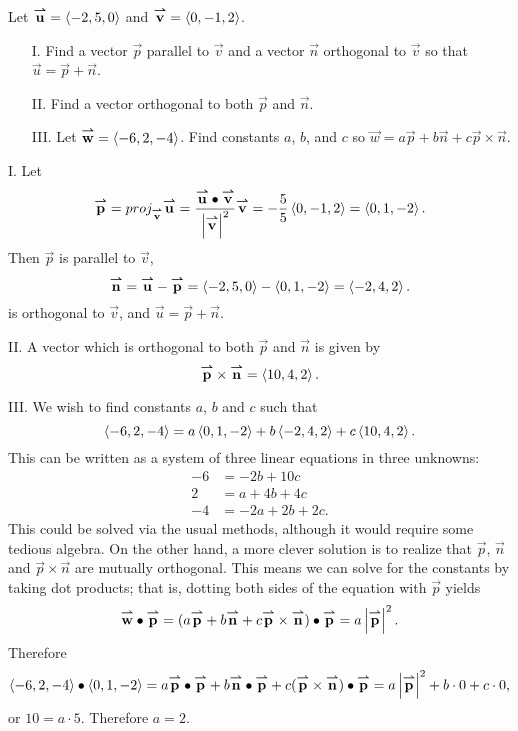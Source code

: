 \documentclass[noauthor, handout]{ximera}
\begin{document}
\begin{problem}
Let $\vec{u} = \vector{-2,5,0}$ and $\vec{v} = \vector{0,-1,2}$. 
\begin{itemize}
\item[I.] Find a vector $\vec{p}$ parallel to $\vec{v}$ and a vector $\vec{n}$ orthogonal to $\vec{v}$ so that $\vec{u} = \vec{p} + \vec{n}$.

\item[II.]  Find a vector orthogonal to both $\vec{p}$ and $\vec{n}$.

\item[III.] Let $\vec{w} = \vector{-6,2,-4}$. Find constants $a$, $b$, and $c$ so $\vec{w} = a\vec{p}+b\vec{n}+c\vec{p} \times \vec{n}$.

\end{itemize}

\begin{freeResponse}
I. Let 
$$
\vec{p} = proj_\vec{v} \vec{u} = \frac{\vec{u}\dotp \vec{v}}{\left|\vec{v}\right|^2} \vec{v} = -\frac{5}{5} \vector{0,-1,2} = \vector{0,1,-2}.
$$
Then $\vec{p}$ is parallel to $\vec{v}$, 
$$
\vec{n} = \vec{u} - \vec{p} = \vector{-2,5,0} - \vector{0,1,-2} = \vector{-2,4,2}.
$$
is orthogonal to $\vec{v}$, and $\vec{u} = \vec{p} + \vec{n}$.

II. A vector which is orthogonal to both $\vec{p}$ and $\vec{n}$ is given by
$$
\vec{p} \times \vec{n} = \vector{10,4,2}.
$$

III. We wish to find constants $a$, $b$ and $c$ such that 
$$
\vector{-6,2,-4} = a \vector{0,1,-2} + b \vector{-2,4,2} + c \vector{10,4,2}.
$$
This can be written as a system of three linear equations in three unknowns:
\begin{align*}
-6 &= -2b + 10c \\
2 &= a + 4b + 4c \\
-4 &= -2a + 2b + 2c.
\end{align*}
This could be solved via the usual methods, although it would require some tedious algebra. On the other hand, a more clever solution is to realize that $\vec{p}$, $\vec{n}$ and $\vec{p} \times \vec{n}$ are mutually orthogonal. This means we can solve for the constants by taking dot products; that is, dotting both sides of the equation with $\vec{p}$ yields
$$
\vec{w} \dotp \vec{p} = (a\vec{p}+b\vec{n}+c\vec{p} \times \vec{n})\dotp \vec{p} = a \left|\vec{p}\right|^2.
$$
Therefore
$$
\vector{-6,2,-4} \dotp \vector{0,1,-2} = a \vec{p} \dotp \vec{p} + b \vec{n} \dotp \vec{p} + c (\vec{p} \times \vec{n})\dotp \vec{p} = a \left|\vec{p}\right|^2 + b \cdot 0 + c \cdot 0,
$$
or $10 = a \cdot 5$. Therefore $a=2$. 


\end{freeResponse}
\end{problem}
\end{document}
